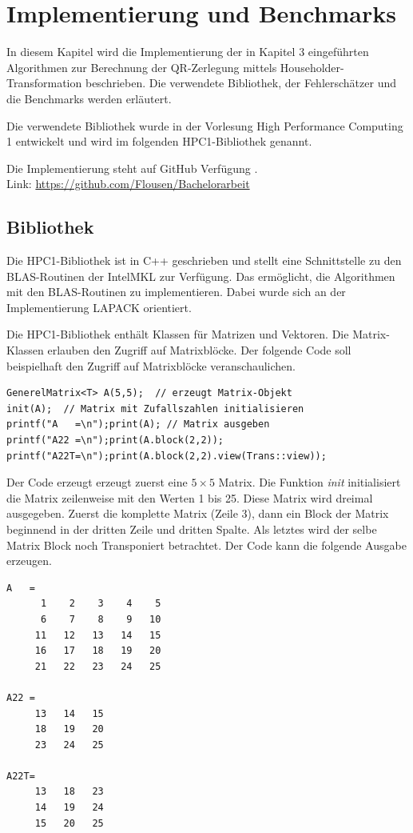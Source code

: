 \chapter{Implementierung und Benchmarks}

In diesem Kapitel wird die Implementierung der in Kapitel 3 eingeführten Algorithmen zur Berechnung der QR-Zerlegung mittels Householder-Transformation beschrieben. 
Die verwendete Bibliothek, der Fehlerschätzer und die Benchmarks werden erläutert. 

Die verwendete Bibliothek wurde in der Vorlesung High Performance Computing 1 entwickelt \cite{HPC1} und wird im folgenden HPC1-Bibliothek genannt.


Die Implementierung steht auf GitHub Verfügung \cite{git}.\\
Link: \url{https://github.com/Flousen/Bachelorarbeit}

\section{Bibliothek}
Die HPC1-Bibliothek ist in C++ geschrieben und stellt eine Schnittstelle zu den BLAS-Routinen der IntelMKL zur Verfügung.
Das ermöglicht, die Algorithmen mit den BLAS-Routinen zu implementieren.
Dabei wurde sich an der Implementierung LAPACK orientiert.


Die HPC1-Bibliothek enthält Klassen für Matrizen und Vektoren.
Die Matrix-Klassen erlauben den Zugriff auf Matrixblöcke. 
Der folgende Code soll beispielhaft den Zugriff auf Matrixblöcke veranschaulichen.
\begin{lstlisting}
GenerelMatrix<T> A(5,5);  // erzeugt Matrix-Objekt
init(A);  // Matrix mit Zufallszahlen initialisieren
printf("A   =\n");print(A); // Matrix ausgeben
printf("A22 =\n");print(A.block(2,2));
printf("A22T=\n");print(A.block(2,2).view(Trans::view));
\end{lstlisting}
Der Code erzeugt erzeugt zuerst eine $5 \times 5$ Matrix.
Die Funktion \textit{init} initialisiert die Matrix zeilenweise mit den Werten 1 bis 25.
Diese Matrix wird dreimal ausgegeben. Zuerst die komplette Matrix (Zeile 3), dann ein Block der Matrix beginnend in der dritten Zeile und dritten Spalte. Als letztes wird der selbe Matrix Block noch Transponiert betrachtet. Der Code kann die folgende Ausgabe erzeugen.
\lstset{numbers=none}
\begin{lstlisting} 
A   = 
      1    2    3    4    5
      6    7    8    9   10
     11   12   13   14   15
     16   17   18   19   20
     21   22   23   24   25

A22 = 
     13   14   15
     18   19   20
     23   24   25

A22T= 
     13   18   23
     14   19   24
     15   20   25
\end{lstlisting}


